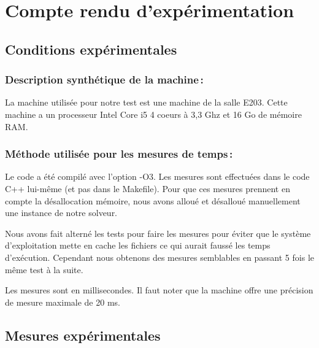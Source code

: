 \documentclass[a4paper, 10pt, french]{article}
\begin{document}
\section{Compte rendu d'expérimentation}
  \subsection{Conditions expérimentales}

    \subsubsection{Description synthétique de la machine\,:} 

    La machine utilisée pour notre test est une machine de la salle E203.
    Cette machine a un processeur Intel Core i5 4 coeurs à 3,3 Ghz et 16 Go de mémoire RAM.

    \subsubsection{Méthode utilisée pour les mesures de temps\,: } 

    Le code a été compilé avec l'option -O3.
    Les mesures sont effectuées dans le code C++ lui-même (et pas dans le Makefile).
    Pour que ces mesures prennent en compte la désallocation mémoire, nous avons
    alloué et désalloué manuellement une instance de notre solveur.

    Nous avons fait alterné les tests pour faire les mesures pour éviter que
    le système d'exploitation mette en cache les fichiers ce qui aurait faussé les temps d'exécution.
    Cependant nous obtenons des mesures semblables en passant 5 fois le même test à la suite.

    Les mesures sont en millisecondes.
    Il faut noter que la machine offre une précision de mesure maximale de 20 ms.

  \subsection{Mesures expérimentales}
\end{document}
